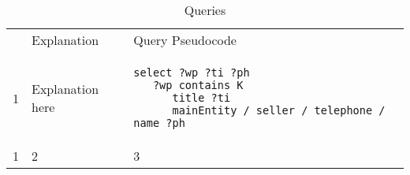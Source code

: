 

\begin{table} 
\begin{tabular}{ l l l }
 & Explanation & Query Pseudocode\\ 
%
1 & Explanation here & 
\begin{minipage}{3in}\begin{lstlisting}
select ?wp ?ti ?ph
   ?wp contains K
      title ?ti
      mainEntity / seller / telephone / name ?ph
\end{lstlisting}\end{minipage}\\
1&2&3 \\
%
\end{tabular} 
    \caption{Queries} 
\end{table}

